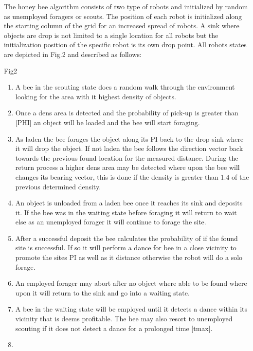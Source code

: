\documentclass[12pt]{article}
\begin{document}
\par{The honey bee algorithm consists of two type of robots and initialized by random as unemployed foragers or scouts. The position of each robot is initialized along the starting column of the grid for an increased spread of robots. A sink where objects are drop is not limited to a single location for all robots but the initialization position of the specific robot is its own drop point. All robots states are depicted in Fig.2 and described as follows:}
\\
\par{Fig2}
\\
\begin{enumerate}[nolistsep]
	\item A bee in the scouting state does a random walk through the environment looking for the area with it highest density of objects.
	\item Once a dens area is detected and the probability  of pick-up is greater than [PHI] an object will be loaded and the bee will start foraging.
	\item As laden the bee forages the object along its PI back to the drop sink where it will drop the object. If not laden the bee follows the direction vector back towards the previous found location for the measured distance. During the return process a higher dens area may be detected where upon the bee will changes its bearing vector, this is done if the density is greater than 1.4 of the previous determined density.
	\item An object is unloaded from a laden bee once it reaches its sink and deposits it. If the bee was in the waiting state before foraging it will return to wait else as an unemployed forager it will continue to forage the site.
	\item After a successful deposit the bee calculates the probability of if the found site is successful. If so it will perform a dance for bee in a close vicinity to promote the sites PI as well as it distance otherwise the robot will do a solo forage.
	\item An employed forager may abort after no object where able to be found where upon it will return to the sink and go into a waiting state.
	\item A bee in the waiting state will be employed until it detects a dance within its vicinity that is deems profitable.  The bee may also resort to unemployed scouting if it does not detect a dance for a prolonged time [tmax].
	\item 
\end{enumerate}
\end{document}
